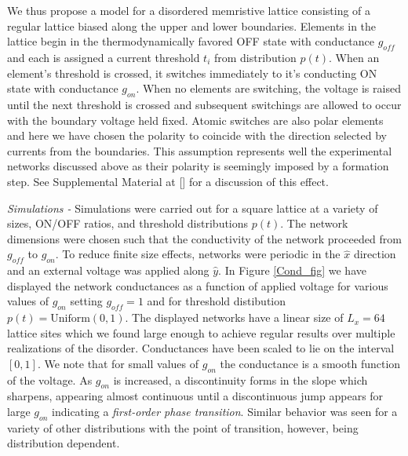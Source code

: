 \documentclass[aps,prl,reprint,groupedaddress]{revtex4-1}
\begin{document}
We thus propose a model for a disordered memristive lattice consisting of a
regular lattice biased along the upper and lower boundaries.  Elements in
the lattice begin in the thermodynamically favored OFF state with conductance
$g_{off}$ and each is assigned a current threshold $t_i$ from distribution
$p(t)$.  When an element's threshold is crossed, it switches immediately to
it's conducting ON state with conductance $g_{on}$. When no elements are
switching, the voltage is raised until the next threshold is crossed and
subsequent switchings are allowed to occur with the
boundary voltage held fixed.  Atomic switches are also polar elements and
here we have chosen the polarity to coincide with the direction selected by
currents from the boundaries.  This assumption represents well 
the experimental networks discussed above as their polarity is seemingly
imposed by a formation step.  See Supplemental Material at []
for a discussion of this effect.

{\it Simulations - } Simulations were carried out for a square lattice at a
variety of sizes,
ON/OFF ratios, and threshold distributions $p(t)$.  The network dimensions
were chosen such that the conductivity of the network proceeded from $g_{off}$
to $g_{on}$.  To reduce finite size effects, networks were periodic in the
$\hat{x}$ direction and an external voltage was applied along $\hat{y}$. In
Figure \ref{Cond_fig} we have displayed the network conductances as a function of
applied voltage for various values of $g_{on}$ setting $g_{off} = 1$ and for
threshold distibution $p(t) = \textrm{Uniform}(0,1)$.  The displayed networks have
a linear size of $L_x=64$ lattice sites which we found large enough to achieve
regular results over multiple realizations of the disorder. Conductances
have been scaled to lie on the interval $[0,1]$. We note that for small values
of $g_{on}$ the conductance is a smooth function of the voltage.  As $g_{on}$
is increased, a discontinuity forms in the slope which sharpens, appearing
almost continuous until a discontinuous jump appears for large $g_{on}$
indicating a {\it first-order phase transition}.  Similar behavior was seen for
a variety of other distributions with the point of transition, however, being
distribution dependent.
\end{document}
